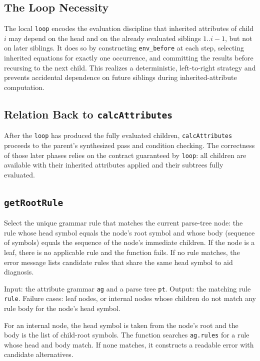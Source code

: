 \subsection{The Loop Necessity}
The local \texttt{loop} encodes the evaluation discipline that inherited attributes of child \(i\) may depend on the head and on the already evaluated 
siblings \(1..i-1\), but not on later siblings. It does so by constructing \texttt{env\_before} at each step, selecting inherited equations for exactly 
one occurrence, and committing the results before recursing to the next child. This realizes a deterministic, left-to-right strategy and prevents 
accidental dependence on future siblings during inherited-attribute computation. 

\subsection{Relation Back to \texttt{calcAttributes}}
After the \texttt{loop} has produced the fully evaluated children, \texttt{calcAttributes} proceeds to the parent's synthesized pass and condition checking. 
The correctness of those later phases relies on the contract guaranteed by \texttt{loop}: all children are available with their inherited attributes applied 
and their subtrees fully evaluated.


\subsection{\texttt{getRootRule}}
Select the unique grammar rule that matches the current parse-tree node: the rule whose head symbol equals the node's root symbol and whose body 
(sequence of symbols) equals the sequence of the node's immediate children. If the node is a leaf, there is no applicable rule and the function fails. 
If no rule matches, the error message lists candidate rules that share the same head symbol to aid diagnosis. 

Input: the attribute grammar \texttt{ag} and a parse tree \texttt{pt}.  
Output: the matching rule \texttt{rule}.  
Failure cases: leaf nodes, or internal nodes whose children do not match any rule body for the node's head symbol. 

For an internal node, the head symbol is taken from the node's root and the body is the list of child-root symbols. The function searches \texttt{ag.rules} for 
a rule whose head and body match. If none matches, it constructs a readable error with candidate alternatives. 

